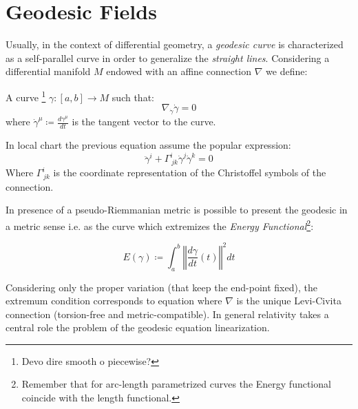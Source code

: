 \documentclass[Main]{subfiles}
\begin{document}
\chapter{Geodesic Fields}
	Usually, in the context of differential geometry, a \emph{geodesic curve} is characterized as a self-parallel curve in order to generalize the \emph{straight lines}.
	Considering a differential manifold $M$ endowed with an affine connection $\nabla$ we define:
	\begin{definition}[Geodesic]
		A curve \danger\footnote{Devo dire smooth o piecewise? }
		$\gamma:[a,b]\rightarrow M$ such that:
		\begin{equation}
			\nabla_{\dot{\gamma}}\dot{\gamma} =0
		\end{equation}
		where $\dot{\gamma}^\mu \coloneqq \frac{d \gamma^\mu}{d t}$ is the tangent vector to the curve.
	\end{definition}
	\begin{notationfix}
		In local chart the previous equation assume the popular expression:
		\begin{equation}\label{GeodesicEquation}
			\ddot{\gamma}^i + \Gamma^i_{\, j k} \dot{\gamma}^j \dot{\gamma}^k = 0
		\end{equation}
		Where $ \Gamma^i_{\, j k}$ is the coordinate representation of the Christoffel symbols of the connection.
	\end{notationfix}
	In presence of a pseudo-Riemmanian metric is possible to present the geodesic in a metric sense i.e. as the curve  which extremizes the \emph{Energy Functional}\footnote{Remember that for arc-length parametrized curves the Energy functional coincide with the length functional.\cite[Lemma $1.4.2$ ]{Jost2005}}:
	\begin{definition}
  	\begin{displaymath}
 		E(\gamma) \coloneqq \int_a^b \left\Vert \frac{d \gamma}{dt} (t)\right\Vert^2 dt
 	\end{displaymath}
\end{definition} 	
	Considering only the proper variation (that keep the end-point fixed), the extremum condition corresponds to equation \label{GeodesicEquation} where $\nabla$ is the unique Levi-Civita connection (torsion-free and metric-compatible).
	In general relativity takes a central role the problem of the geodesic equation linearization.
\end{document}
